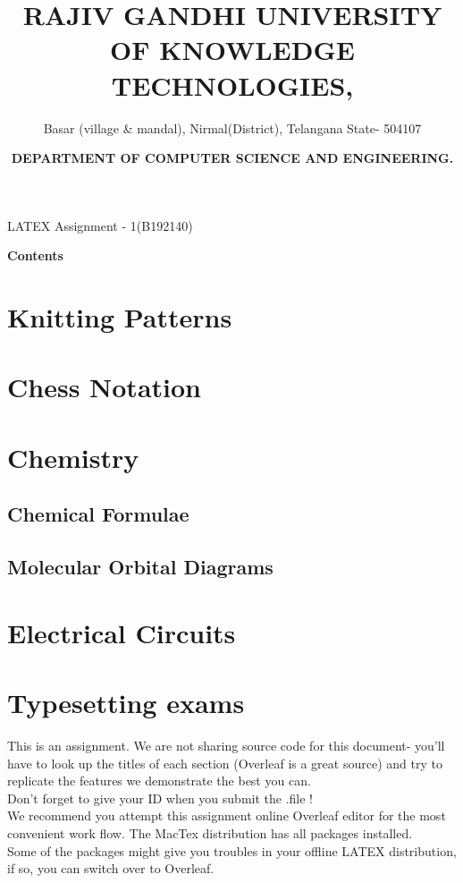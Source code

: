 \documentclass{knittingpattern}
\title{\color{blue}\centering\large\textbf{RAJIV GANDHI UNIVERSITY OF KNOWLEDGE TECHNOLOGIES,}}
\author{\color{blue}\centering\normalsize Basar (village \& mandal), Nirmal(District), Telangana State- 504107 }
\date{ \color{red}\centering \large \textbf{DEPARTMENT OF COMPUTER SCIENCE AND ENGINEERING.}}
\begin{document}
\maketitle
\hline
\vspace{0.5 cm}
\centering
\large{LATEX Assignment - 1(B192140)}
\\
\begin{flushleft}
\Large\textbf{Contents}
\section{Knitting Patterns}
\section{Chess Notation}
\section{Chemistry}
\subsection{Chemical Formulae}
\subsection{Molecular Orbital Diagrams}
\section{Electrical Circuits}
\section{Typesetting exams}
\end{flushleft}
\raggedright
This is an assignment. We are not sharing source code for this document- you'll have to look up the titles of each section (Overleaf is a great source) and try to replicate the features we demonstrate the best you can.\\
\medskip
Don't forget to give your ID when you submit the .file !\\
\medskip
We recommend you attempt this assignment online Overleaf editor for the most convenient work flow. The MacTex distribution has all packages installed.\\
\medskip
Some of the packages might give you troubles in your offline LATEX distribution, if so, you can switch over to Overleaf.\\
\bigskip
\bigskip
\centering
{}
\newpage
{}
\end{document}
